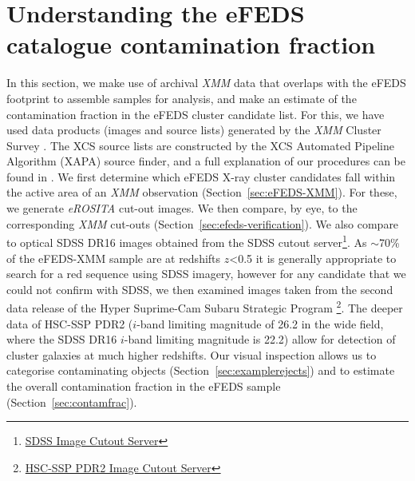 \documentclass[fleqn,usenatbib]{mnras}
\begin{document}
\section{Understanding the \lowercase{e}FEDS catalogue contamination fraction}
\label{sec:efedsxmm}

In this section, we make use of archival {\em XMM} data that overlaps with the eFEDS footprint to assemble samples for analysis, and make an estimate of the contamination fraction in the eFEDS cluster candidate list. For this, we have used data products (images and source lists) generated by the {\em XMM} Cluster Survey \citep[XCS,][]{xcsfoundation}. The XCS source lists are constructed by the XCS Automated Pipeline Algorithm (XAPA) source finder, and a full explanation of our procedures can be found in \cite{xcsmethod}. We first determine which eFEDS X-ray cluster candidates fall within the active area of an {\em XMM} observation (Section~\ref{sec:eFEDS-XMM}). For these, we generate {\em eROSITA} cut-out images. We then compare, by eye, to the corresponding {\em XMM} cut-outs (Section~\ref{sec:efeds-verification}). We also compare to optical SDSS DR16 \citep[][]{dr16} images obtained from the SDSS cutout server\footnote{\href{https://skyserver.sdss.org/dr16/SkyserverWS/ImgCutout/getjpeg?ra=134.07450039749338&dec=-1.6358207558060298&width=1631&height=1631}{SDSS Image Cutout Server}}. As ${\sim}$70\% of the eFEDS-XMM sample are at redshifts $z$<0.5 it is generally appropriate to search for a red sequence using SDSS imagery, however for any candidate that we could not confirm with SDSS, we then examined images taken from the second data release of the Hyper Suprime-Cam Subaru Strategic Program \citep[HSC-SSP PDR2,][]{hsc_prd2}\footnote{\href{https://hsc-release.mtk.nao.ac.jp/das_cutout/pdr2/}{\color{blue}HSC-SSP PDR2 Image Cutout Server}}. The deeper data of HSC-SSP PDR2 ($i$-band limiting magnitude of 26.2 in the wide field, where the SDSS DR16 $i$-band limiting magnitude is 22.2) allow for detection of cluster galaxies at much higher redshifts.  Our visual inspection allows us to categorise contaminating objects (Section~\ref{sec:examplerejects}) and to estimate the overall contamination fraction in the eFEDS sample (Section~\ref{sec:contamfrac}).
\end{document}
